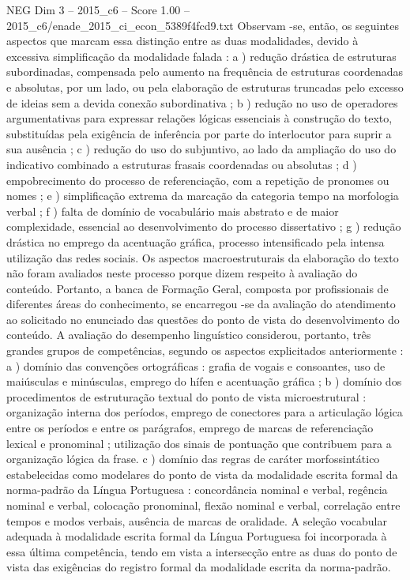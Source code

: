\begin{textsample}{NEG Dim 3 – 2015\_c6 – Score 1.00 – 2015\_c6/enade\_2015\_ci\_econ\_5389f4fcd9.txt}
Observam -se, então, os seguintes aspectos que marcam essa distinção entre as duas modalidades, devido à excessiva simplificação da modalidade falada : a ) redução drástica de estruturas subordinadas, compensada pelo aumento na frequência de estruturas coordenadas e absolutas, por um lado, ou pela elaboração de estruturas truncadas pelo excesso de ideias sem a devida conexão subordinativa ; b ) redução no uso de operadores argumentativas para expressar relações lógicas essenciais à construção do texto, substituídas pela exigência de inferência por parte do interlocutor para suprir a sua ausência ; c ) redução do uso do subjuntivo, ao lado da ampliação do uso do indicativo combinado a estruturas frasais coordenadas ou absolutas ; d ) empobrecimento do processo de referenciação, com a repetição de pronomes ou nomes ; e ) simplificação extrema da marcação da categoria tempo na morfologia verbal ; f ) falta de domínio de vocabulário mais abstrato e de maior complexidade, essencial ao desenvolvimento do processo dissertativo ; g ) redução drástica no emprego da acentuação gráfica, processo intensificado pela intensa utilização das redes sociais.
Os aspectos macroestruturais da elaboração do texto não foram avaliados neste processo porque dizem respeito à avaliação do conteúdo.
Portanto, a banca de Formação Geral, composta por profissionais de diferentes áreas do conhecimento, se encarregou -se da avaliação do atendimento ao solicitado no enunciado das questões do ponto de vista do desenvolvimento do conteúdo.
A avaliação do desempenho linguístico considerou, portanto, três grandes grupos de competências, segundo os aspectos explicitados anteriormente : a ) domínio das convenções ortográficas : grafia de vogais e consoantes, uso de maiúsculas e minúsculas, emprego do hífen e acentuação gráfica ; b ) domínio dos procedimentos de estruturação textual do ponto de vista microestrutural : organização interna dos períodos, emprego de conectores para a articulação lógica entre os períodos e entre os parágrafos, emprego de marcas de referenciação lexical e pronominal ; utilização dos sinais de pontuação que contribuem para a organização lógica da frase. c ) domínio das regras de caráter morfossintático estabelecidas como modelares do ponto de vista da modalidade escrita formal da norma-padrão da Língua Portuguesa : concordância nominal e verbal, regência nominal e verbal, colocação pronominal, flexão nominal e verbal, correlação entre tempos e modos verbais, ausência de marcas de oralidade.
A seleção vocabular adequada à modalidade escrita formal da Língua Portuguesa foi incorporada à essa última competência, tendo em vista a intersecção entre as duas do ponto de vista das exigências do registro formal da modalidade escrita da norma-padrão.

\end{textsample}
